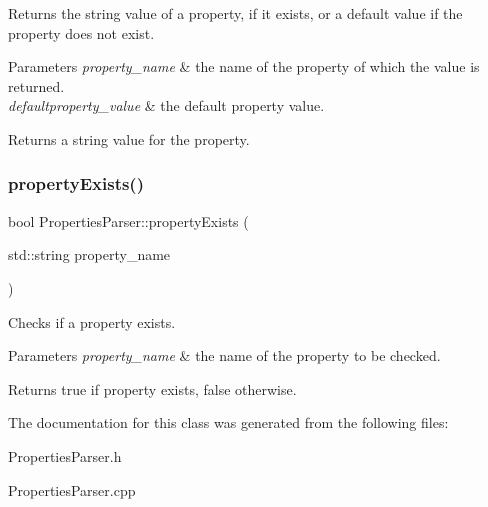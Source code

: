 Returns the string value of a property, if it exists, or a default value if the property does not exist.


\begin{DoxyParams}{Parameters}
{\em property\+\_\+name} & the name of the property of which the value is returned. \\
\hline
{\em defaultproperty\+\_\+value} & the default property value. \\
\hline
\end{DoxyParams}
\begin{DoxyReturn}{Returns}
a string value for the property. 
\end{DoxyReturn}
\mbox{\label{class_properties_parser_a8011fb7f2f3f24c59d3c33d56be55033}} 
\subsubsection{\texorpdfstring{property\+Exists()}{propertyExists()}}
{\footnotesize\ttfamily bool Properties\+Parser\+::property\+Exists (\begin{DoxyParamCaption}\item[{std\+::string}]{property\+\_\+name }\end{DoxyParamCaption})}

Checks if a property exists.


\begin{DoxyParams}{Parameters}
{\em property\+\_\+name} & the name of the property to be checked. \\
\hline
\end{DoxyParams}
\begin{DoxyReturn}{Returns}
{\ttfamily true} if property exists, {\ttfamily false} otherwise. 
\end{DoxyReturn}


The documentation for this class was generated from the following files\+:\begin{DoxyCompactItemize}
\item 
Properties\+Parser.\+h\item 
Properties\+Parser.\+cpp\end{DoxyCompactItemize}
